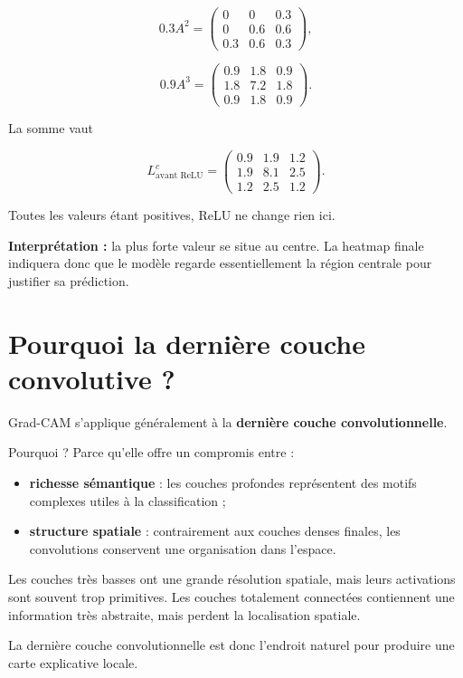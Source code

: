 ﻿\documentclass[11pt,a4paper]{article}
\begin{document}
\[
0.3A^2=
\begin{pmatrix}
0 & 0 & 0.3 \\
0 & 0.6 & 0.6 \\
0.3 & 0.6 & 0.3
\end{pmatrix},
\]

\[
0.9A^3=
\begin{pmatrix}
0.9 & 1.8 & 0.9 \\
1.8 & 7.2 & 1.8 \\
0.9 & 1.8 & 0.9
\end{pmatrix}.
\]

La somme vaut

\[
L^c_{\text{avant ReLU}}=
\begin{pmatrix}
0.9 & 1.9 & 1.2 \\
1.9 & 8.1 & 2.5 \\
1.2 & 2.5 & 1.2
\end{pmatrix}.
\]

Toutes les valeurs étant positives, ReLU ne change rien ici.

\textbf{Interprétation :}
la plus forte valeur se situe au centre. La heatmap finale indiquera donc que le modèle regarde essentiellement la région centrale pour justifier sa prédiction.

\section{Pourquoi la dernière couche convolutive ?}

Grad-CAM s'applique généralement à la \textbf{dernière couche convolutionnelle}.

Pourquoi ? Parce qu'elle offre un compromis entre :
\begin{itemize}
    \item \textbf{richesse sémantique} : les couches profondes représentent des motifs complexes utiles à la classification ;
    \item \textbf{structure spatiale} : contrairement aux couches denses finales, les convolutions conservent une organisation dans l'espace.
\end{itemize}

Les couches très basses ont une grande résolution spatiale, mais leurs activations sont souvent trop primitives. Les couches totalement connectées contiennent une information très abstraite, mais perdent la localisation spatiale.

La dernière couche convolutionnelle est donc l'endroit naturel pour produire une carte explicative locale.
\end{document}
